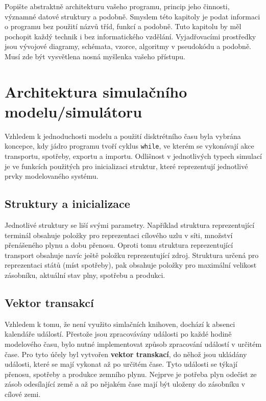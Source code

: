 \documentclass[a4paper,11pt]{article}
\begin{document}
Popište abstraktně architekturu vašeho programu, princip jeho činnosti, významné datové struktury a podobně. Smyslem této kapitoly je podat informaci o programu bez použití názvů tříd, funkcí a podobně. Tuto kapitolu by měl pochopit každý technik i bez informatického vzdělání. Vyjadřovacími prostředky jsou vývojové diagramy, schémata, vzorce, algoritmy v pseudokódu a podobně. Musí zde být vysvětlena nosná myšlenka vašeho přístupu.


\section{Architektura simulačního modelu/simulátoru}


Vzhledem k jednoduchosti modelu a použití
disktrétního času\cite[str,22]{IMS} byla vybrána koncepce,
kdy jádro programu tvoří cyklus \texttt{while}, ve kterém se
vykonávají akce transportu, spotřeby, exportu a importu.
Odlišnost v jednotlivých typech simulací je ve funkcích
použitých pro inicializaci struktur, které reprezentují
jednotlivé prvky modelovaného systému.

\subsection{Struktury a inicializace}

Jednotlivé struktury se liší svými parametry.
Například struktura reprezentující terminál obsahuje položky pro reprezentaci cílového uzlu v síti,
množství přenášeného plynu a dobu přenosu.
Oproti tomu struktura reprezentující transport obsahuje navíc ještě položku reprezentující zdroj.
Struktura určená pro reprezentaci států (míst spotřeby), pak obsahuje položky pro maximální velikost zásobníku,
aktuální stav plny, spotřebu a  produkci.

\subsection{Vektor transakcí}

Vzhledem k tomu, že není využito simlačních knihoven, dochází k absenci kalendáře událostí.
Přestože jsou zpracovávány události po každé hodině modelového času,
bylo nutné implementovat způsob zpracování událostí v určitém čase.
Pro tyto účely byl vytvořen \textbf{vektor transkací}, do něhož jsou ukládány události,
které se mají vykonat až po určitém čase.
Tyto události se týkají přenosu, spotřeby a produkce zemního plynu.
Nejprve je potřeba plyn odečíst ze zásob odesílající země a až po nějakém čase mají být uloženy do zásobníku v cílové zemi.
\end{document}
